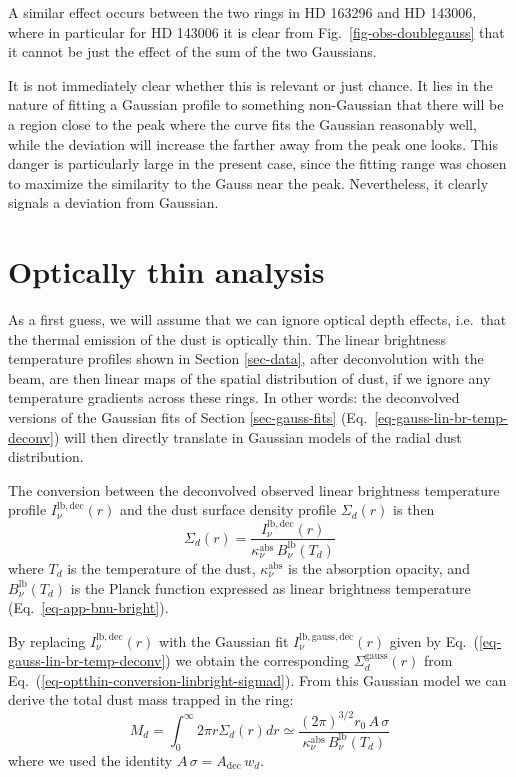 \documentclass{aa}
\begin{document}
A similar effect occurs between the two rings in HD 163296 and HD 143006, where
in particular for HD 143006 it is clear from Fig.~\ref{fig-obs-doublegauss} that
it cannot be just the effect of the sum of the two Gaussians.

It is not immediately clear whether this is relevant or just chance. It lies in
the nature of fitting a Gaussian profile to something non-Gaussian that there
will be a region close to the peak where the curve fits the Gaussian reasonably
well, while the deviation will increase the farther away from the peak one
looks. This danger is particularly large in the present case, since the fitting
range was chosen to maximize the similarity to the Gauss near the
peak. Nevertheless, it clearly signals a deviation from Gaussian.



\section{Optically thin analysis}
\label{sec-opt-thin-analysis}
%
As a first guess, we will assume that we can ignore optical depth effects,
i.e.\ that the thermal emission of the dust is optically thin. The linear
brightness temperature profiles shown in Section \ref{sec-data}, after
deconvolution with the beam, are then linear maps of the spatial distribution of
dust, if we ignore any temperature gradients across these rings.  In other
words: the deconvolved versions of the Gaussian fits of Section
\ref{sec-gauss-fits} (Eq.~\ref{eq-gauss-lin-br-temp-deconv}) will then directly
translate in Gaussian models of the radial dust distribution.

The conversion between the deconvolved observed linear brightness temperature
profile $I_\nu^{\mathrm{lb,dec}}(r)$ and the dust surface density profile
$\Sigma_d(r)$ is then
\begin{equation}\label{eq-optthin-conversion-linbright-sigmad}
  \Sigma_d(r) =  \frac{I_\nu^{\mathrm{lb,dec}}(r)}{\kappa_\nu^{\mathrm{abs}}\, B_\nu^{\mathrm{lb}}(T_d)} 
\end{equation}
where $T_d$ is the temperature of the dust, $\kappa_\nu^{\mathrm{abs}}$ is the
absorption opacity, and $B_\nu^{\mathrm{lb}}(T_d)$ is the Planck function
expressed as linear brightness temperature (Eq.~\ref{eq-app-bnu-bright}).

By replacing $I_\nu^{\mathrm{lb,dec}}(r)$ with the Gaussian fit
$I_\nu^{\mathrm{lb,gauss,dec}}(r)$ given by
Eq.~(\ref{eq-gauss-lin-br-temp-deconv}) we obtain the corresponding
$\Sigma_d^{\mathrm{gauss}}(r)$ from
Eq.~(\ref{eq-optthin-conversion-linbright-sigmad}). From this Gaussian
model we can derive the total dust mass trapped in the ring:
\begin{equation}
  M_d = \int_0^\infty 2\pi r \Sigma_d(r) dr \simeq
  \frac{(2\pi)^{3/2} r_0\, A\,\sigma}{\kappa_\nu^{\mathrm{abs}}\, B_\nu^{\mathrm{lb}}(T_d)}
\end{equation}
where we used the identity $A\,\sigma=A_{\mathrm{dec}}\,w_d$.
\end{document}
